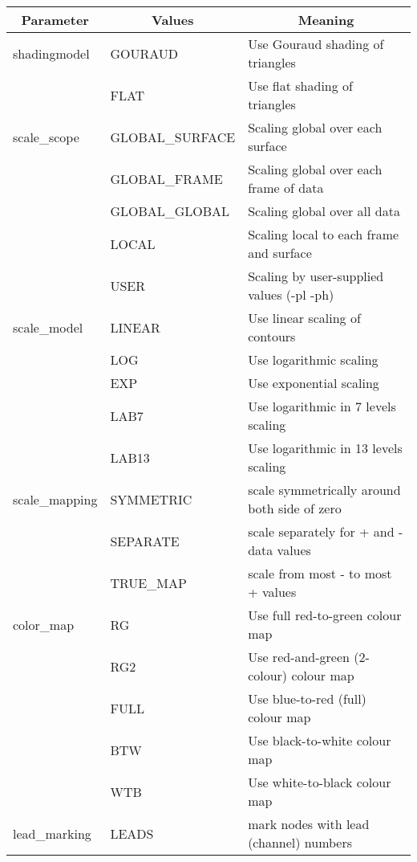 \begin{center}
\begin{tabular}{|l|l|p{3.2in}|} \hline
\multicolumn{1}{|c|}{Parameter} &
\multicolumn{1}{|c|}{Values} &
\multicolumn{1}{|c|}{Meaning} \\ \hline
shadingmodel & GOURAUD & Use Gouraud shading of triangles \\ 
             & FLAT    & Use flat shading of triangles \\ \hline
scale\_scope  & GLOBAL\_SURFACE & Scaling global over each surface \\ 
             & GLOBAL\_FRAME   & Scaling global over each frame of data \\
             & GLOBAL\_GLOBAL  & Scaling global over all data \\
             & LOCAL          & Scaling local to each frame and surface\\
             & USER           & Scaling by user-supplied values (-pl -ph)
             \\
\hline
scale\_model  & LINEAR & Use linear scaling of contours \\
             & LOG    & Use logarithmic scaling \\
             & EXP    & Use exponential scaling \\
             & LAB7   & Use logarithmic in 7 levels scaling \\
             & LAB13  & Use logarithmic in 13 levels scaling \\ 
\hline
scale\_mapping & SYMMETRIC & scale symmetrically around both side of zero\\
              & SEPARATE  & scale separately for + and - data values\\
              & TRUE\_MAP  & scale from most - to most + values\\
\hline
color\_map     & RG       & Use full red-to-green colour map \\
              & RG2      & Use red-and-green (2-colour) colour map \\
              & FULL     & Use blue-to-red (full) colour map \\
              & BTW      & Use black-to-white colour map \\
              & WTB      & Use white-to-black colour map \\
\hline
lead\_marking\footnotemark 
              & LEADS          & mark nodes with lead (channel)
                                                             numbers\\ 

\end{tabular}
\end{center}
